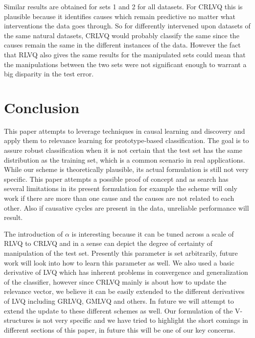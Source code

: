 \documentclass{esannV2}
\begin{document}
Similar results are obtained for sets 1 and 2 for all datasets. For CRLVQ this is plausible because it identifies causes which remain predictive no matter what interventions the data goes through. So for differently intervened upon datasets of the same natural datasets, CRLVQ would probably classify the same since the causes remain the same in the different instances of the data. However the fact that RLVQ also gives the same results for the manipulated sets could mean that the manipulations between the two sets were not significant enough to warrant a big disparity in the test error.

\section{Conclusion}
\label{sec:Conclusion}

This paper attempts to leverage techniques in causal learning and discovery and apply them to relevance learning for prototype-based classification. The goal is to assure robust classification when it is not certain that the test set has the same distribution as the training set, which is a common scenario in real applications. While our scheme is theoretically plausible, its actual formulation is still not very specific. This paper attempts a possible proof of concept and as search has several limitations in its present formulation for example the scheme will only work if there are more than one cause and the causes are not related to each other. Also if causative cycles are present in the data, unreliable performance will result. 

The introduction of $\alpha$ is interesting because it can be tuned across a scale of RLVQ to CRLVQ and in a sense can depict the degree of certainty of manipulation of the test set. Presently this parameter is set arbitrarily, future work will look into how to learn this parameter as well. We also used a basic derivative of LVQ which has inherent problems in convergence and generalization of the classifier, however since CRLVQ mainly is about how to update the relevance vector, we believe it can be easily extended to the different derivatives of LVQ including GRLVQ, GMLVQ and others. In future we will attempt to extend the update to these different schemes as well. Our formulation of the V-structures is not very specific and we have tried to highlight the short comings in different sections of this paper, in future this will be one of our key concerns.


\begin{footnotesize}




\end{footnotesize}

\end{document}
